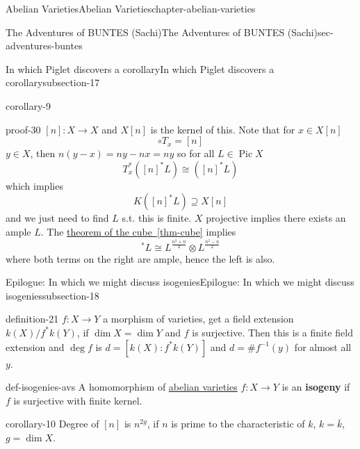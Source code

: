\documentclass[oneside,10pt,]{book}
\newcommand{\terminology}[1]{\textbf{#1}}
\numberwithin{equation}{section}
\newcommand{\lb}{[}
\newcommand{\rb}{]}
\DeclareMathOperator{\Pic}{Pic}
\begin{document}
\begin{chapterptx}{Abelian Varieties}{}{Abelian Varieties}{}{}{chapter-abelian-varieties}
\begin{sectionptx}{The Adventures of BUNTES (Sachi)}{}{The Adventures of BUNTES (Sachi)}{}{}{sec-adventures-buntes}
\begin{subsectionptx}{In which Piglet discovers a corollary}{}{In which Piglet discovers a corollary}{}{}{subsection-17}
\begin{corollary}{}{}{corollary-9}
\end{corollary}
\begin{proofptx}{}{proof-30}
\hypertarget{p-158}{}%
\([n]\colon X \to X\) and \(X[n]\) is the kernel of this. Note that for \(x\in X[n]\)%
\begin{equation*}
[n]\circ T_x = [n]
\end{equation*}
\(y\in X\), then \(n(y-x) = ny - nx = ny\) so for all \(L \in \Pic X\)%
\begin{equation*}
T_x^*([n]^* L ) \cong ([n]^* L)
\end{equation*}
which implies%
\begin{equation*}
K([n]^* L ) \supseteq X[n]
\end{equation*}
and we just need to find \(L\) s.t. this is finite. \(X\) projective implies there exists an ample \(L\). The \hyperref[thm-cube]{theorem of the cube~\ref{thm-cube}} implies%
\begin{equation*}
[n]^*L \cong L^{\frac{n^2 + n}{2}} \otimes L^{\frac{n^2 - n}{2}}
\end{equation*}
where both terms on the right are ample, hence the left is also.%
\end{proofptx}
\end{subsectionptx}
%
%
\typeout{************************************************}
\typeout{************************************************}
%
\begin{subsectionptx}{Epilogue: In which we might discuss isogenies}{}{Epilogue: In which we might discuss isogenies}{}{}{subsection-18}
\begin{definition}{}{definition-21}%
\hypertarget{p-159}{}%
\(f\colon X \to Y\) a morphism of varieties, get a field extension \(k(X)/f^*k(Y)\), if \(\dim X = \dim Y\) and \(f\) is surjective. Then this is a finite field extension and \(\deg f\) is \(d = \lb k(X) : f^*k(Y)\rb\) and \(d = \#f^{-1}(y)\) for almost all \(y\).%
\end{definition}
\begin{definition}{}{def-isogenies-avs}%
\hypertarget{p-160}{}%
A homomorphism of \hyperref[def-buntes-abvar]{abelian varieties} \(f\colon X \to Y\) is an \terminology{isogeny} if \(f\) is surjective with finite kernel.%
\end{definition}
\begin{corollary}{}{}{corollary-10}%
\hypertarget{p-161}{}%
Degree of \(\lb n\rb\) is \(n^{2g}\), if \(n\) is prime to the characteristic of \(k\), \(k = \overline k\), \(g = \dim X\).%

\end{corollary}
\end{subsectionptx}
\end{sectionptx}
\end{chapterptx}
\end{document}
